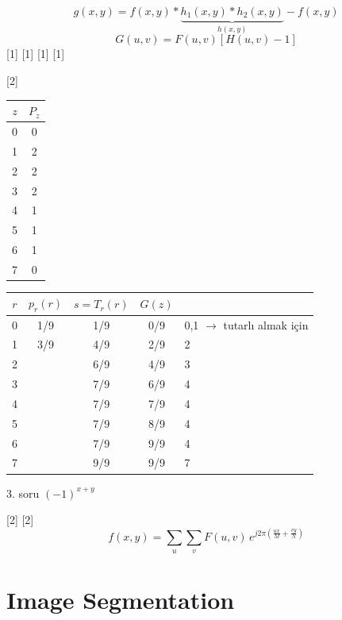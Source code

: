 \documentclass[11pt,a4paper]{article}
\begin{document}

\[ g(x,y)=f(x,y)*\underbrace{h_1(x,y)*h_2(x,y)}_{h(x,y)}-f(x,y) \]
\[ G(u,v)=F(u,v)\left[H(u,v)-1\right] \]
[1]
[1]
[1]
[1]

[2]
\begin{center}
\renewcommand{\arraystretch}{1.25}
\begin{tabular}{c|c}
$z$ & $P_z$ \\ \hline
0 & 0 \\
1 & 2 \\
2 & 2 \\
3 & 2 \\
4 & 1 \\
5 & 1 \\
6 & 1 \\
7 & 0
\end{tabular}
\qquad
\begin{tabular}{c|c|c|c l}
$r$ & $p_r(r)$ & $s=T_r(r)$ & $G(z)$ & \\ \hline
0 & 1/9 & 1/9 & 0/9 & \textcolor{kirmizikalem}{0,1 $\rightarrow$ {\scriptsize tutarlı almak için}}\\
1 & 3/9 & 4/9 & 2/9 & \textcolor{kirmizikalem}{2}\\
2 &  & 6/9 & 4/9 & \textcolor{kirmizikalem}{3}\\
3 &  & 7/9 & 6/9 & \textcolor{kirmizikalem}{4}\\
4 &  & 7/9 & 7/9 & \textcolor{kirmizikalem}{4}\\
5 &  & 7/9 & 8/9 & \textcolor{kirmizikalem}{4}\\
6 &  & 7/9 & 9/9 & \textcolor{kirmizikalem}{4}\\
7 &  & 9/9 & 9/9 & \textcolor{kirmizikalem}{7}
\end{tabular}
\end{center}
3. soru \quad $(-1)^{x+y}$

[2]
[2]
\[ f(x,y)=\sum_{u}\sum_{v}F(u,v)\,e^{j2\pi\left(\frac{ux}{M}+\frac{vy}{N}\right)} \]

\section{Image Segmentation}
\end{document}
